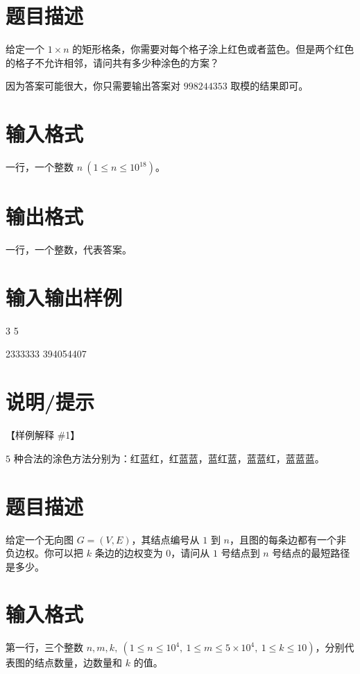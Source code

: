 \documentclass{ctpro}
\begin{document}
\makeproblem
\section*{题目描述}

给定一个 $1 \times n$ 的矩形格条，你需要对每个格子涂上红色或者蓝色。但是两个红色的格子不允许相邻，请问共有多少种涂色的方案？

因为答案可能很大，你只需要输出答案对 $998244353$ 取模的结果即可。

\section*{输入格式}

一行，一个整数 $n~(1 \leq n \leq {10}^{18})$。

\section*{输出格式}

一行，一个整数，代表答案。

\section*{输入输出样例}

\testcasetab
{
    3
}
{
    5
}

\testcasetab
{
    2333333
}
{
    394054407
}

\section*{说明/提示}

【样例解释 \#1】

$5$ 种合法的涂色方法分别为：红蓝红，红蓝蓝，蓝红蓝，蓝蓝红，蓝蓝蓝。

\makeproblem
\section*{题目描述}

给定一个无向图 $G=(V,E)$，其结点编号从 $1$ 到 $n$，且图的每条边都有一个非负边权。你可以把 $k$ 条边的边权变为 $0$，请问从 $1$ 号结点到 $n$ 号结点的最短路径是多少。

\section*{输入格式}

第一行，三个整数 $n,m,k,~(1 \leq n \leq {10}^4,~1 \leq m \leq 5 \times {10}^4,~1 \leq k \leq 10)$，分别代表图的结点数量，边数量和 $k$ 的值。
\end{document}
